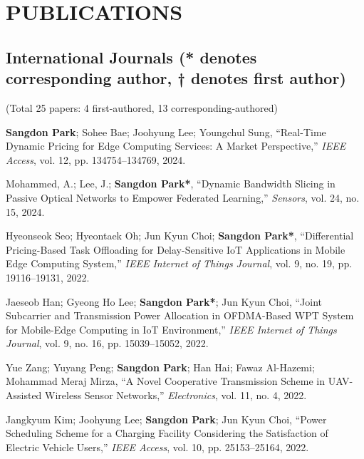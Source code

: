 \documentclass[11pt,a4paper]{article}
\begin{document}
\section{PUBLICATIONS}

\subsection{International Journals (* denotes corresponding author, † denotes first author)}
(Total 25 papers: 4 first-authored, 13 corresponding-authored)

\begin{enumerate}[label={[{\arabic*}]}, leftmargin=*, itemsep=0.3em]

\item \textbf{Sangdon Park}; Sohee Bae; Joohyung Lee; Youngchul Sung, ``Real-Time Dynamic Pricing for Edge Computing Services: A Market Perspective,'' \textit{IEEE Access}, vol. 12, pp. 134754--134769, 2024.

\item Mohammed, A.; Lee, J.; \textbf{Sangdon Park*}, ``Dynamic Bandwidth Slicing in Passive Optical Networks to Empower Federated Learning,'' \textit{Sensors}, vol. 24, no. 15, 2024.

\item Hyeonseok Seo; Hyeontaek Oh; Jun Kyun Choi; \textbf{Sangdon Park*}, ``Differential Pricing-Based Task Offloading for Delay-Sensitive IoT Applications in Mobile Edge Computing System,'' \textit{IEEE Internet of Things Journal}, vol. 9, no. 19, pp. 19116--19131, 2022.

\item Jaeseob Han; Gyeong Ho Lee; \textbf{Sangdon Park*}; Jun Kyun Choi, ``Joint Subcarrier and Transmission Power Allocation in OFDMA-Based WPT System for Mobile-Edge Computing in IoT Environment,'' \textit{IEEE Internet of Things Journal}, vol. 9, no. 16, pp. 15039--15052, 2022.

\item Yue Zang; Yuyang Peng; \textbf{Sangdon Park}; Han Hai; Fawaz Al-Hazemi; Mohammad Meraj Mirza, ``A Novel Cooperative Transmission Scheme in UAV-Assisted Wireless Sensor Networks,'' \textit{Electronics}, vol. 11, no. 4, 2022.

\item Jangkyum Kim; Joohyung Lee; \textbf{Sangdon Park}; Jun Kyun Choi, ``Power Scheduling Scheme for a Charging Facility Considering the Satisfaction of Electric Vehicle Users,'' \textit{IEEE Access}, vol. 10, pp. 25153--25164, 2022.


\end{enumerate}
\end{document}
